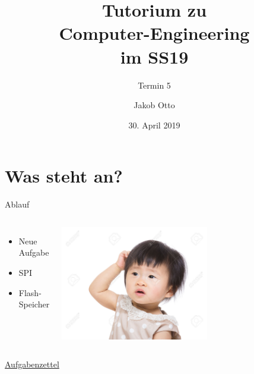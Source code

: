 \documentclass[aspectratio=169,presentation]{beamer}
\date{30. April 2019}
\newcommand{\sectionframe}[1]{
	\begin{frame}
		\vfill
		\Huge
		\centering
		\usebeamercolor[fg]{title}
		#1
		\vfill
		\par
	\end{frame}
}
\newcommand{\terminNummer}{5}
\begin{document}
\title[CE Tutorium]{Tutorium zu\\Computer-Engineering\\im SS19}
\subtitle{Termin \terminNummer}
\author[Otto]{Jakob Otto}
\subject{CE Tutorium}

\titlepage

\section{Was steht an?}
\begin{frame}{Ablauf}
	\begin{columns}
		\begin{itemize}
      \item Neue Aufgabe
      \item SPI
      \item Flash-Speicher
		\end{itemize}
		\includegraphics[width=0.6\textwidth]{kratzen}
	\end{columns}
\end{frame}



\sectionframe{\href{https://users.informatik.haw-hamburg.de/~schafers/LOCAL/S18S_CE/Aufgabenzettel_Nr4_v00.pdf}{Aufgabenzettel}\\\color{red}{Achtung alte Version!}}
\end{document}
